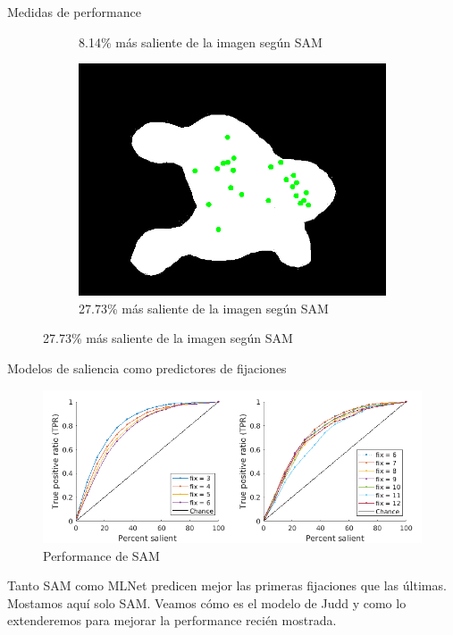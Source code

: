 \documentclass[compress]{beamer}
\begin{document}
\begin{frame}{Medidas de performance}
\begin{figure}[b]
\begin{subfigure}[t]{0.3\textwidth}
        \caption{\footnotesize 8.14\% más saliente de la imagen según SAM} \label{fig:example-salient-percent-8-14}
    \end{subfigure}
	\hfill
	\begin{subfigure}[t]{0.3\textwidth}
        \centering
        \includegraphics[width=\linewidth]{images/example-salient-percent-27-73.png} 
        \caption{\footnotesize
27.73\% más saliente de la imagen según SAM} \label{fig:example-salient-percent-27-73}
    \end{subfigure}
\end{figure}

\end{frame}

\begin{frame}{Modelos de saliencia como predictores de fijaciones}

\begin{figure}
\includegraphics[width=\linewidth]{images/sam_all_fix_small.png} 
\caption{Performance de SAM}
\end{figure}

{\footnotesize Tanto SAM como MLNet predicen mejor las primeras fijaciones que las últimas. Mostamos aquí solo SAM. Veamos cómo es el modelo de Judd y como lo extenderemos para mejorar la performance recién mostrada.}

\end{frame}
\end{document}
